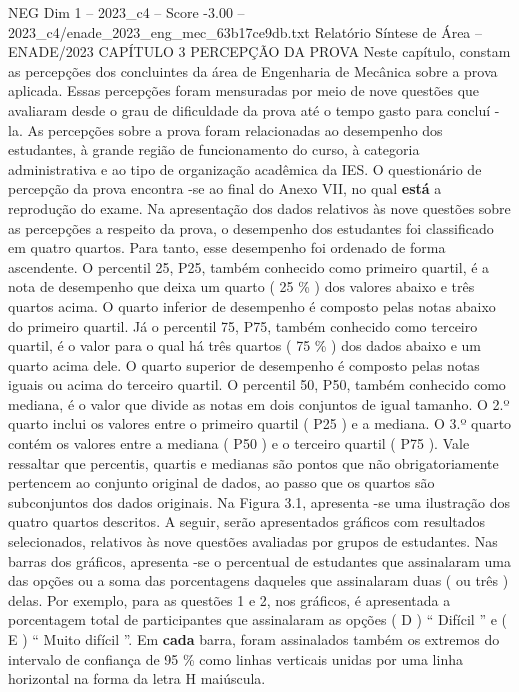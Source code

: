 \begin{textsample}{NEG Dim 1 – 2023\_c4 – Score -3.00 – 2023\_c4/enade\_2023\_eng\_mec\_63b17ce9db.txt}  \label{ex:f1_neg_242}
Relatório Síntese de Área – ENADE/2023 CAPÍTULO 3 PERCEPÇÃO DA PROVA Neste capítulo, constam as percepções dos concluintes da área de Engenharia de Mecânica sobre a prova aplicada.
Essas percepções foram mensuradas por meio de nove questões que avaliaram desde o grau de dificuldade da prova até o tempo gasto para concluí -la.
As percepções sobre a prova foram relacionadas ao desempenho dos estudantes, à grande região de funcionamento do curso, à categoria administrativa e ao tipo de organização acadêmica da IES.
O questionário de percepção da prova encontra -se ao final do Anexo VII, no qual \textbf{está} a reprodução do exame.
Na apresentação dos dados relativos às nove questões sobre as percepções a respeito da prova, o desempenho dos estudantes foi classificado em quatro quartos.
Para tanto, esse desempenho foi ordenado de forma ascendente.
O percentil 25, P25, também conhecido como primeiro quartil, é a nota de desempenho que deixa um quarto ( 25 \% ) dos valores abaixo e três quartos acima.
O quarto inferior de desempenho é composto pelas notas abaixo do primeiro quartil.
Já o percentil 75, P75, também conhecido como terceiro quartil, é o valor para o qual há três quartos ( 75 \% ) dos dados abaixo e um quarto acima dele.
O quarto superior de desempenho é composto pelas notas iguais ou acima do terceiro quartil.
O percentil 50, P50, também conhecido como mediana, é o valor que divide as notas em dois conjuntos de igual tamanho.
O 2.º quarto inclui os valores entre o primeiro quartil ( P25 ) e a mediana.
O 3.º quarto contém os valores entre a mediana ( P50 ) e o terceiro quartil ( P75 ).
Vale ressaltar que percentis, quartis e medianas são pontos que não obrigatoriamente pertencem ao conjunto original de dados, ao passo que os quartos são subconjuntos dos dados originais.
Na Figura 3.1, apresenta -se uma ilustração dos quatro quartos descritos.
A seguir, serão apresentados gráficos com resultados selecionados, relativos às nove questões avaliadas por grupos de estudantes.
Nas barras dos gráficos, apresenta -se o percentual de estudantes que assinalaram uma das opções ou a soma das porcentagens daqueles que assinalaram duas ( ou três ) delas.
Por exemplo, para as questões 1 e 2, nos gráficos, é apresentada a porcentagem total de participantes que assinalaram as opções ( D ) “ Difícil ” e ( E ) “ Muito difícil ”.
Em \textbf{cada} barra, foram assinalados também os extremos do intervalo de confiança de 95 \% como linhas verticais unidas por uma linha horizontal na forma da letra H maiúscula.

\end{textsample}
